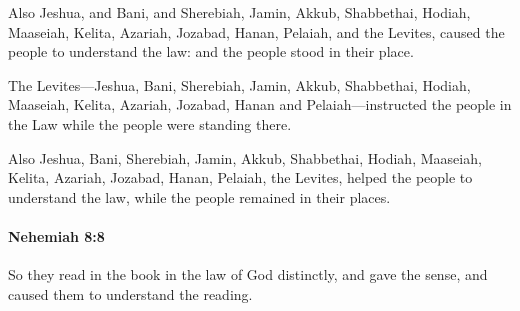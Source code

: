 			\begin{versebox}
					\item[BHS] 
					\item[LXX] 
					\item[ASV] Also Jeshua, and Bani, and Sherebiah, Jamin, Akkub, Shabbethai, Hodiah, Maaseiah, Kelita, Azariah, Jozabad, Hanan, Pelaiah, and the Levites, caused the people to understand the law: and the people stood in their place.
					\item[NIV] The Levites—Jeshua, Bani, Sherebiah, Jamin, Akkub, Shabbethai, Hodiah, Maaseiah, Kelita, Azariah, Jozabad, Hanan and Pelaiah—instructed the people in the Law while the people were standing there.
					\item[NRSV] Also Jeshua, Bani, Sherebiah, Jamin, Akkub, Shabbethai, Hodiah, Maaseiah, Kelita, Azariah, Jozabad, Hanan, Pelaiah, the Levites, helped the people to understand the law, while the people remained in their places.
			\end{versebox}

		\paragraph{Nehemiah 8:8} %
			\label{NEHEMIAH-8-8}

			So they read in the book in the law of God distinctly, and gave the sense, and caused them to understand the reading.

